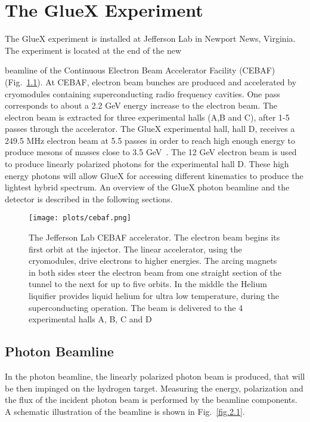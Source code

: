 \chapter{The GlueX Experiment}
\label{p.2}

The GlueX experiment is installed at Jefferson Lab in Newport News, Virginia. The experiment is located at the end of the new {beamline of the Continuous Electron Beam Accelerator Facility (CEBAF) (Fig.~\ref{fig.2}). At CEBAF, electron beam bunches are produced and accelerated by cryomodules containing superconducting radio frequency cavities. One pass corresponds to about a 2.2 GeV energy increase to the electron beam. The electron beam is extracted for three experimental halls (A,B and C), after 1-5 passes through the accelerator. The GlueX experimental hall, hall D, receives a 249.5 MHz electron beam at 5.5 passes in order to reach high enough energy to produce mesons of masses close to 3.5 GeV~\cite{Charles16}. The 12 GeV electron beam is used to produce linearly polarized photons for the experimental hall D. These high energy photons will allow GlueX for accessing different kinematics to produce the lightest hybrid spectrum. An overview of the GlueX photon beamline and the detector is described in the following sections.

\begin{figure}[H]
    \centering
        \texttt{[image: plots/cebaf.png]}
        \caption{The Jefferson Lab CEBAF accelerator. The electron beam begins its first orbit at the injector. The linear accelerator, using the cryomodules, drive electrons to higher energies. The arcing magnets in both sides steer the electron beam from one straight section of the tunnel to the next for up to five orbits. In the middle the Helium liquifier provides liquid helium for ultra low temperature, during the superconducting operation. The beam is delivered to the 4 experimental halls A, B, C and D~\cite{Charles16}}
        \label{fig.2}
\end{figure}

\section{Photon Beamline}
\label{p.2.1}

In the photon beamline, the linearly polarized photon beam is produced, that will be then impinged on the hydrogen target. Measuring the energy, polarization and the flux of the incident photon beam is performed by the beamline components. A schematic illustration of the beamline is shown in Fig.~\ref{fig.2.1}.

}
